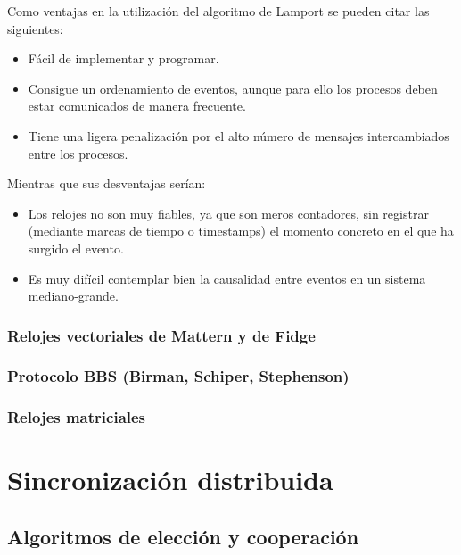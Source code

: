 \documentclass[a4paper, 11pt, titlepage]{article}
\begin{document}
            Como ventajas en la utilización del algoritmo de Lamport se pueden citar las siguientes:

            \begin{itemize}
                \item Fácil de implementar y programar. 
                \item Consigue un ordenamiento de eventos, aunque para ello los procesos deben estar 
                comunicados de manera frecuente.
                \item Tiene una ligera penalización por el alto número de mensajes intercambiados entre 
                los procesos.
            \end{itemize}

            Mientras que sus desventajas serían:

            \begin{itemize}
                \item Los relojes no son muy fiables, ya que son meros contadores, sin registrar (mediante 
                marcas de tiempo o timestamps) el momento concreto en el que ha surgido el evento.
                \item Es muy difícil contemplar bien la causalidad entre eventos en un sistema mediano-grande.
            \end{itemize}

        \subsubsection{Relojes vectoriales de Mattern y de Fidge}

        \subsubsection{Protocolo BBS (Birman, Schiper, Stephenson)}

        \subsubsection{Relojes matriciales}

\section{Sincronización distribuida}

    \subsection{Algoritmos de elección y cooperación}
\end{document}
